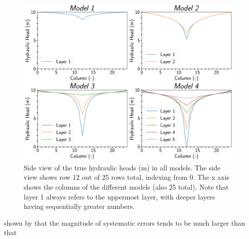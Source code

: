 \begin{figure}[htb!]
\centering
\includegraphics[width=1.0\linewidth]{Figures/heads_side.png}
\caption{Side view of the true hydraulic heads (m) in all models. The side view shows row 12 out of 25 rows total, indexing from 0. The x axis shows the columns of the different models (also 25 total). Note that layer 1 always refers to the uppermost layer, with deeper layers having sequentially greater numbers.\label{fig_heads_side}}
\end{figure} %

\noindent shown by \cite{rau2019error} that the magnitude of systematic errors tends to be much larger than that 

